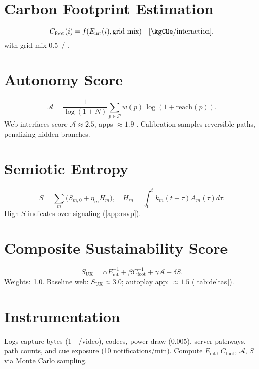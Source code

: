 \documentclass[openany]{book}
\newcommand{\Sent}{S} %
\newcommand{\Eint}{E_{\mathrm{int}}} %
\newcommand{\Cfoot}{C_{\mathrm{foot}}} %
\newcommand{\Auton}{\mathcal{A}} %
\newcommand{\SUX}{S_{\mathrm{UX}}} %
\newcommand{\kWh}{\mathrm{kWh}}
\begin{document}
\section{Carbon Footprint Estimation}
\label{sec:metrics-carbon}
\begin{equation}
\label{eq:Cfoot}
\Cfoot(i) = f(\Eint(i), \text{grid mix}) \quad [\kgCOe/\text{interaction}],
\end{equation}
with grid mix \SI{0.5}{\kgCOe/\kWh} \citep{colak2024}.

\section{Autonomy Score}
\label{sec:metrics-autonomy}
\begin{equation}
\label{eq:autonomy}
\Auton = \frac{1}{\log(1+N)}\sum_{p\in \mathcal{P}} w(p)\,\log(1+\mathrm{reach}(p)).
\end{equation}
Web interfaces score \(\Auton \approx 2.5\), apps \(\approx 1.9\) \citep{doctorow2022}. Calibration samples reversible paths, penalizing hidden branches.

\section{Semiotic Entropy}
\label{sec:metrics-entropy}
\begin{equation}
\label{eq:metrics-S}
\Sent = \sum_m \big(S_{m,0} + \eta_m H_m\big), \quad H_m = \int_0^t k_m(t-\tau) A_m(\tau) d\tau.
\end{equation}
High \(\Sent\) indicates over-signaling (\cref{app:rsvp}).

\section{Composite Sustainability Score}
\label{sec:metrics-composite}
\begin{equation}
\label{eq:metrics-SUX}
\SUX = \alpha \Eint^{-1} + \beta \Cfoot^{-1} + \gamma \Auton - \delta \Sent.
\end{equation}
Weights: 1.0. Baseline web: \(\SUX \approx 3.0\); autoplay app: \(\approx 1.5\) (\cref{tab:deltas}).

\section{Instrumentation}
\label{sec:instrumentation}
Logs capture bytes (\SI{1}{\mega\byte}/video), codecs, power draw (\SI{0.005}{\kWh}), server pathways, path counts, and cue exposure (10 notifications/min). Compute \(\Eint\), \(\Cfoot\), \(\Auton\), \(\Sent\) via Monte Carlo sampling.
\end{document}
